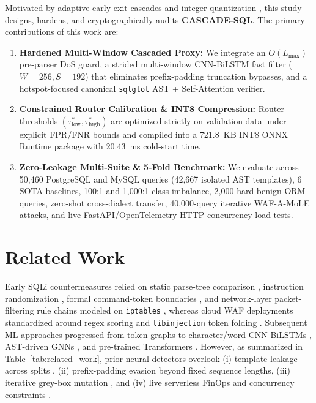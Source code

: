 \documentclass[preprint,12pt]{elsarticle}
\begin{document}
Motivated by adaptive early-exit cascades \cite{viola2001cascade,teerapittayanon2016branchynet,bolukbasi2017adaptive,xin2020deebert} and integer quantization \cite{jacob2018quantization,gholami2022quant_survey,onnxruntime2021}, this study designs, hardens, and cryptographically audits \textbf{CASCADE-SQL}. The primary contributions of this work are:
\begin{enumerate}
  \item \textbf{Hardened Multi-Window Cascaded Proxy:} We integrate an $O(L_{\max})$ pre-parser DoS guard, a strided multi-window CNN-BiLSTM fast filter ($W=256, S=192$) that eliminates prefix-padding truncation bypasses, and a hotspot-focused canonical \texttt{sqlglot} AST + Self-Attention verifier.
  \item \textbf{Constrained Router Calibration \& INT8 Compression:} Router thresholds $(\tau_{\text{low}}^*, \tau_{\text{high}}^*)$ are optimized strictly on validation data under explicit FPR/FNR bounds and compiled into a 721.8~KB INT8 ONNX Runtime package with 20.43~ms cold-start time.
  \item \textbf{Zero-Leakage Multi-Suite \& 5-Fold Benchmark:} We evaluate across 50,460 PostgreSQL and MySQL queries (42,667 isolated AST templates), 6 SOTA baselines, 100:1 and 1,000:1 class imbalance, 2,000 hard-benign ORM queries, zero-shot cross-dialect transfer, 40,000-query iterative WAF-A-MoLE attacks, and live FastAPI/OpenTelemetry HTTP concurrency load tests.
\end{enumerate}

\section{Related Work}
Early SQLi countermeasures relied on static parse-tree comparison \cite{buehrer2005parse}, instruction randomization \cite{boyd2004sqlrand}, formal command-token boundaries \cite{su2006essence}, and network-layer packet-filtering rule chains modeled on \texttt{iptables} \cite{noiumkar2012iptables}, whereas cloud WAF deployments standardized around regex scoring \cite{owaspcrs2024} and \texttt{libinjection} token folding \cite{galbreath2013libinj}. Subsequent ML approaches progressed from token graphs \cite{kar2016sqligot} to character/word CNN-BiLSTMs \cite{fang2018bilstm,liu2019deepwaf,zhang2020cnn_bilstm}, AST-driven GNNs \cite{tang2020sql_ast,li2021ast_gnn}, and pre-trained Transformers \cite{guan2023bert_sqli,chen2023trans_waf}. However, as summarized in Table~\ref{tab:related_work}, prior neural detectors overlook (i) template leakage across splits \cite{arp2022dos_donts}, (ii) prefix-padding evasion beyond fixed sequence lengths, (iii) iterative grey-box mutation \cite{demetrio2020wafamole}, and (iv) live serverless FinOps and concurrency constraints \cite{eismann2021serverless_cost}.
\end{document}
